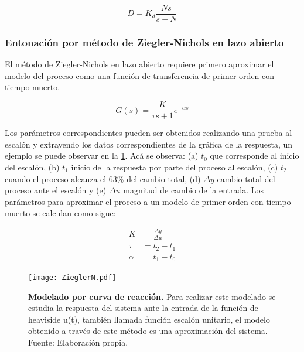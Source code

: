                 \begin{equation}\label{eq:Daproximacion}
                    D = K_d \frac{N s}{s + N}
                \end{equation}

        \subsubsection{Entonación por método de Ziegler-Nichols en lazo abierto}
			
            El método de Ziegler-Nichols en lazo abierto requiere primero aproximar el modelo del proceso como una función de transferencia de primer orden con tiempo muerto.
            
            \begin{equation}\label{eq:firstorderProcess}
                G(s) = \frac{K}{\tau s + 1} e^{-\alpha s}
            \end{equation}
            
            Los parámetros correspondientes pueden ser obtenidos realizando una prueba al escalón y extrayendo los datos correspondientes de la gráfica de la respuesta, un ejemplo se puede observar en la \cref{fig:ZNtest}. Acá se observa: (a) $t_{0}$ que corresponde al inicio del escalón, (b) $t_{1}$ inicio de la respuesta por parte del proceso al escalón, (c) $t_{2}$ cuando el proceso alcanza el 63\% del cambio total, (d) $\Delta y$ cambio total del proceso ante el escalón y (e) $\Delta u$ magnitud de cambio de la entrada. Los parámetros para aproximar el proceso a un modelo de primer orden con tiempo muerto se calculan como sigue:
            
            \begin{align}
                K &= \frac{\Delta y}{\Delta u}\label{eq:parametroK}\\
                \tau &= t_{2} - t_{1}\label{eq:parametroTau}\\
                \alpha &= t_{1} - t_{0}\label{eq:parametroAlfa}
            \end{align}
            
            \begin{figure}[htb]
                \centering
                \texttt{[image: ZieglerN.pdf]}
                \caption[Modelado por curva de reacción]{\textbf{Modelado por curva de reacción.} Para realizar este modelado se estudia la respuesta del sistema ante la entrada de la función de heaviside u(t), también llamada función escalón unitario, el modelo obtenido a través de este método es una aproximación del sistema. Fuente: Elaboración propia.} 
                \label{fig:ZNtest}
            \end{figure}
            
